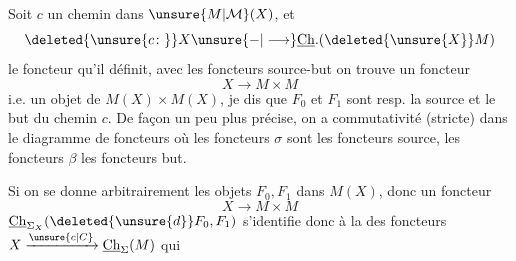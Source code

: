 
Soit $c$ un  chemin dans $\unsure{M|\mathcal{M}}(X)$, et
\[
  \deleted{\unsure{c\colon}} X\unsure{\mathord{-}|\longrightarrow}\underline{\mathrm{Ch}}.(\deleted{\unsure{X}}M)
\]
le foncteur qu'il définit,  avec les foncteurs source-but  on trouve un foncteur 
\[
 X\longrightarrow M\times M
\]
i.e. un objet  de $M(X)\times M(X)$,  je dis que  $F_0$ et $F_1$ sont resp. la source et le but du chemin $c$. De façon un peu plus précise, on a commutativité (stricte) dans le diagramme de foncteurs
où les foncteurs $\sigma$ sont les foncteurs source, les foncteurs $\beta$  les foncteurs but.

Si on se donne arbitrairement les objets $F_0,F_1$ dans $M(X)$, donc un foncteur
\[
 X\longrightarrow M\times M
\]
$\underline{\mathrm{Ch}}_{\Sigma_X}(\deleted{\unsure{d}}F_0,F_1)$ s'identifie donc à la   des foncteurs  $X\xrightarrow{\unsure{c|C}}\underline{\mathrm{Ch}}_\Sigma(M)$ qui \uline{}
